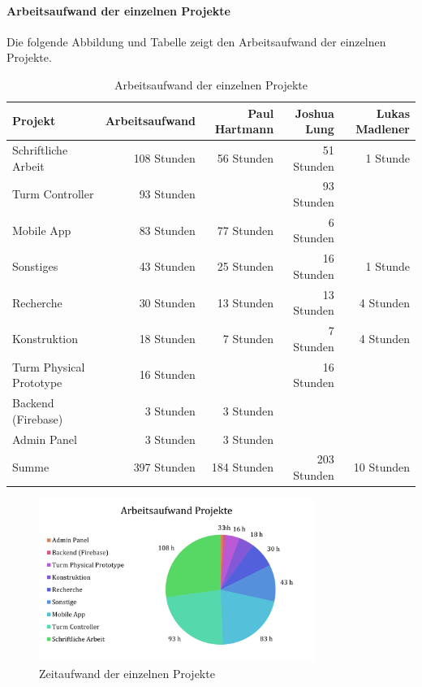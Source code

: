 \paragraph{Arbeitsaufwand der einzelnen Projekte}
Die folgende Abbildung und Tabelle zeigt den Arbeitsaufwand der einzelnen Projekte.

\begin{table}[H]
  \centering
  \small
  \begin{tabular}{lrrrr}
    \toprule
    \textbf{Projekt}        & \textbf{Arbeitsaufwand} & \textbf{Paul Hartmann} & \textbf{Joshua Lung} & \textbf{Lukas Madlener} \\
    \midrule
    Schriftliche Arbeit     & 108 Stunden             & 56 Stunden             & 51 Stunden           & 1 Stunde                \\
    Turm Controller         & 93 Stunden              &                        & 93 Stunden           &                         \\
    Mobile App              & 83 Stunden              & 77 Stunden             & 6 Stunden            &                         \\
    Sonstiges               & 43 Stunden              & 25 Stunden             & 16 Stunden           & 1 Stunde                \\
    Recherche               & 30 Stunden              & 13 Stunden             & 13 Stunden           & 4 Stunden               \\
    Konstruktion            & 18 Stunden              & 7 Stunden              & 7 Stunden            & 4 Stunden               \\
    Turm Physical Prototype & 16 Stunden              &                        & 16 Stunden           &                         \\
    Backend (Firebase)      & 3 Stunden               & 3 Stunden              &                      &                         \\
    Admin Panel             & 3 Stunden               & 3 Stunden              &                      &                         \\
    \midrule
    Summe                   & 397 Stunden             & 184 Stunden            & 203 Stunden          & 10 Stunden              \\
    \bottomrule
  \end{tabular}
  \caption{Arbeitsaufwand der einzelnen Projekte}
  \label{tab:zeiterfassung_projekte}
\end{table}

\begin{figure}[H]
  \centering
  \includegraphics[width=0.8\textwidth]{images/zeiterfassung_projekte.png}
  \caption{Zeitaufwand der einzelnen Projekte}
  \label{fig:zeiterfassung_projekte}
\end{figure}